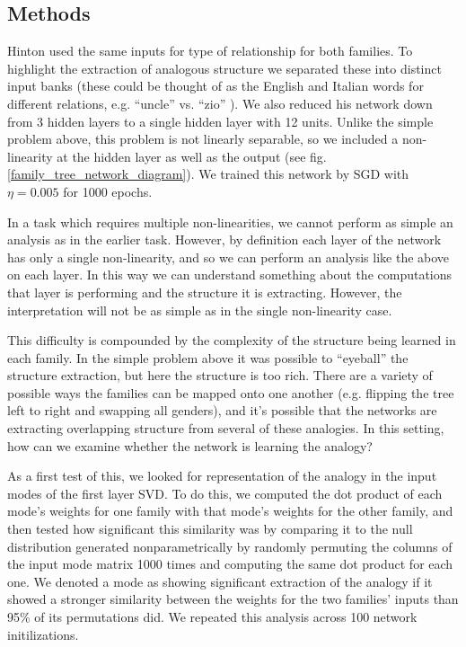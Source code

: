 \documentclass[10pt,letterpaper]{article}
\begin{document}
\subsection{Methods}
Hinton used the same inputs for type of relationship for both families. To highlight the extraction of analogous structure we separated these into distinct input banks (these could be thought of as the English and Italian words for different relations, e.g. ``uncle'' vs. ``zio'' ). We also reduced his network down from 3 hidden layers to a single hidden layer with 12 units. Unlike the simple problem above, this problem is not linearly separable, so we included a non-linearity at the hidden layer as well as the output (see fig. \ref{family_tree_network_diagram}). We trained this network by SGD with \(\eta = 0.005\) for 1000 epochs. \par 
In a task which requires multiple non-linearities, we cannot perform as simple an analysis as in the earlier task. However, by definition each layer of the network has only a single non-linearity, and so we can perform an analysis like the above on each layer. In this way we can understand something about the computations that layer is performing and the structure it is extracting. However, the interpretation will not be as simple as in the single non-linearity case. \par
This difficulty is compounded by the complexity of the structure being learned in each family. In the simple problem above it was possible to ``eyeball'' the structure extraction, but here the structure is too rich. There are a variety of possible ways the families can be mapped onto one another (e.g. flipping the tree left to right and swapping all genders), and it's possible that the networks are extracting overlapping structure from several of these analogies. In this setting, how can we examine whether the network is learning the analogy? \par
As a first test of this, we looked for representation of the analogy in the input modes of the first layer SVD. To do this, we computed the dot product of each mode's weights for one family with that mode's weights for the other family, and then tested how significant this similarity was by comparing it to the null distribution generated nonparametrically by randomly permuting the columns of the input mode matrix 1000 times and computing the same dot product for each one. We denoted a mode as showing significant extraction of the analogy if it showed a stronger similarity between the weights for the two families' inputs than 95\% of its permutations did. We repeated this analysis across 100 network initilizations.  \par
\end{document}

